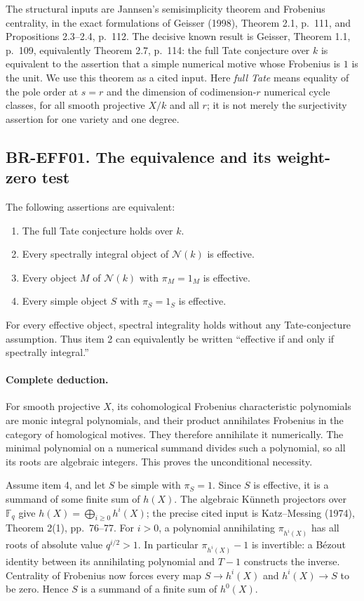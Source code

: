 \documentclass[11pt,a4paper]{article}
\theoremstyle{definition}\newtheorem{definition}[theorem]{Definition}
\theoremstyle{remark}\newtheorem{remark}[theorem]{Remark}
\begin{document}
The structural inputs are Jannsen's semisimplicity theorem and
Frobenius centrality, in the exact formulations of Geisser (1998),
Theorem 2.1, p.~111, and Propositions 2.3--2.4, p.~112.
The decisive known result is Geisser, Theorem 1.1, p.~109,
equivalently Theorem 2.7, p.~114: the full Tate conjecture over $k$
is equivalent to the assertion that a simple numerical motive whose
Frobenius is $1$ is the unit.  We use this theorem as a cited input.
Here \emph{full Tate} means equality of the pole order at $s=r$
and the dimension of codimension-$r$ numerical cycle classes, for
all smooth projective $X/k$ and all $r$; it is not merely the
surjectivity assertion for one variety and one degree.

\subsection{BR-EFF01. The equivalence and its weight-zero test}
The following assertions are equivalent:
\begin{enumerate}
\item The full Tate conjecture holds over $k$.
\item Every spectrally integral object of $\mathcal N(k)$ is effective.
\item Every object $M$ of $\mathcal N(k)$ with $\pi_M=1_M$ is effective.
\item Every simple object $S$ with $\pi_S=1_S$ is effective.
\end{enumerate}
For every effective object, spectral integrality holds without
any Tate-conjecture assumption.  Thus item 2 can equivalently be
written ``effective if and only if spectrally integral.''

\paragraph{Complete deduction.}
For smooth projective $X$, its cohomological Frobenius characteristic
polynomials are monic integral polynomials, and their product annihilates Frobenius
in the category of homological motives.  They therefore annihilate
it numerically.  The minimal polynomial on a numerical summand
divides such a polynomial, so all its roots are algebraic integers.
This proves the unconditional necessity.

Assume item 4, and let $S$ be simple with $\pi_S=1$.  Since $S$
is effective, it is a summand of some finite sum of $h(X)$.
The algebraic K\"unneth projectors over $\mathbb F_q$ give
$h(X)=\bigoplus_{i\geq0}h^i(X)$; the precise cited input is
Katz--Messing (1974), Theorem 2(1), pp.~76--77.
For $i>0$, a polynomial annihilating $\pi_{h^i(X)}$ has all roots
of absolute value $q^{i/2}>1$.  In particular $\pi_{h^i(X)}-1$
is invertible: a B\'ezout identity between its annihilating
polynomial and $T-1$ constructs the inverse.  Centrality of
Frobenius now forces every map $S\to h^i(X)$ and $h^i(X)\to S$
to be zero.  Hence $S$ is a summand of a finite sum of $h^0(X)$.
\end{document}
